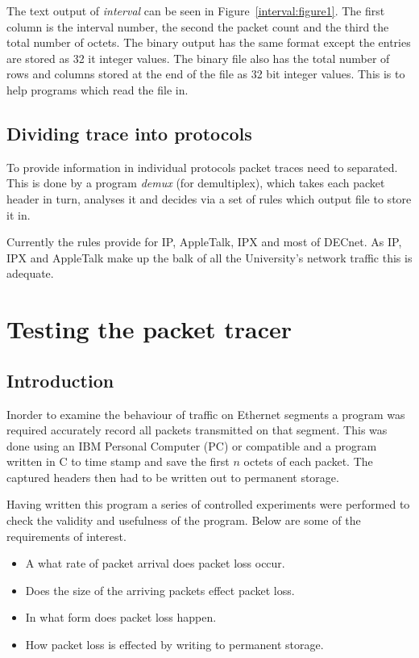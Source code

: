 The text output of {\em interval} can be seen in
Figure~\ref{interval:figure1}.  The first column is the interval
number, the second the packet count and the third the total number of
octets.  The binary output has the same format except the entries are
stored as 32 it integer values.  The binary file also has the total
number of rows and columns stored at the end of the file as 32 bit
integer values.  This is to help programs which read the file in.

\subsection{Dividing trace into protocols}

To provide information in individual protocols packet traces need to
separated.  This is done by a program {\em demux} (for demultiplex),
which takes each packet header in turn, analyses it and decides via a
set of rules which output file to store it in.

Currently the rules provide for IP, AppleTalk, IPX and most of DECnet.
As IP, IPX and AppleTalk make up the balk of all the University's
network traffic this is adequate.

\section{Testing the packet tracer}

\subsection{Introduction}

Inorder to examine the behaviour of traffic on Ethernet segments a
program was required accurately record all packets transmitted on that
segment.  This was done using an IBM Personal Computer (PC) or
compatible and a program written in C to time stamp and save the first
$n$ octets of each packet.  The captured headers then had to be
written out to permanent storage.

Having written this program a series of controlled experiments were
performed to check the validity and usefulness of the program.  Below
are some of the requirements of interest.

\begin{itemize}
\item	A what rate of packet arrival does packet loss occur.

\item	Does the size of the arriving packets effect packet loss.

\item	In what form does packet loss happen.

\item	How packet loss is effected by writing to permanent storage.
\end{itemize}

